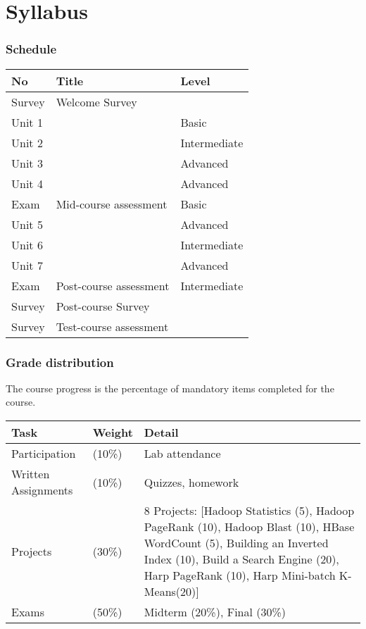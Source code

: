 \part{Syllabus}

\section{Schedule}
\begin{center}
  \begin{tabular}{|l|l|l|}
    \hline
    No & Title & Level \\
    \hline
    Survey 
    &          Welcome Survey
    &          ~ \\
    \hline
    Unit 1 & \nameref{sec:icloud-fundamentals} & Basic \\
    \hline 
    Unit 2 & \nameref{sec:icloud-iaas} & Intermediate \\
    \hline
    Unit 3 & \nameref{sec:icloud-mapreduce} & Advanced \\
    \hline
    Unit 4 & \nameref{sec:icloud-iterative-mapreduce} & Advanced \\
    \hline
    Exam & Mid-course assessment & Basic \\
    \hline
    Unit 5 & \nameref{sec:icloud-nosql} & Advanced \\
    \hline
    Unit 6 & \nameref{sec:icloud-iot}  & Intermediate \\
    \hline
    Unit 7 & \nameref{sec:icloud-saas} & Advanced \\
    \hline
    Exam & Post-course assessment & Intermediate \\
    \hline
    Survey & Post-course Survey  & ~ \\
    \hline
    Survey & Test-course assessment & ~ \\
    \hline
  \end{tabular}
\end{center}

\section{Grade distribution}
The course progress is the percentage of mandatory items completed for the course.

\begin{center}
  \begin{tabular}{|l|l|p{5cm}|}
    \hline
    Task & Weight & Detail \\
    \hline
    Participation & (10\%) & Lab attendance \\
    \hline
    Written Assignments & (10\%) & Quizzes, homework \\
    \hline
    Projects & (30\%) & 8 Projects: [Hadoop Statistics (5), Hadoop PageRank (10), Hadoop Blast (10), HBase WordCount (5), Building an Inverted Index (10), Build a Search Engine (20), Harp PageRank (10), Harp Mini-batch K-Means(20)] \\
    \hline
    Exams & (50\%) & Midterm (20\%), Final (30\%)  \\
    \hline
  \end{tabular}
\end{center}

